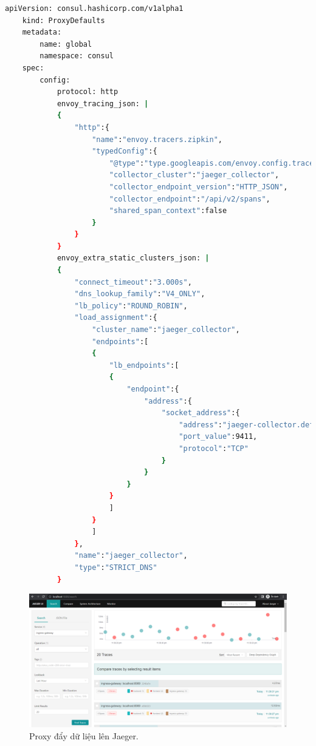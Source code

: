\documentclass[12pt,a4paper]{report}
\begin{document}
	\hspace{0.3cm}{Tiếp theo, chúng ta tiến hành đẩy dữ liệu từ ứng dụng frontend, backend và Proxy lên Jaeger. Để làm được điều này, chúng ta cần can thiệp vào trong code của ứng dụng. Tuy nhiên, ứng dụng frontend và backend đã được cấu hình để có thể đẩy dữ liệu ứng dụng lên trên Jaeger nên chúng ta chỉ việc khai báo thêm biến môi trường cho ứng dụng và ứng dụng sẽ đẩy dữ liệu lên. Còn đối với Proxy, chúng ta cần cấu hình lại một chút như sau:}
	\begin{lstlisting}[language=Bash]
	apiVersion: consul.hashicorp.com/v1alpha1
	kind: ProxyDefaults
	metadata:
		name: global
		namespace: consul
	spec:
		config:
			protocol: http
			envoy_tracing_json: |
			{
				"http":{
					"name":"envoy.tracers.zipkin",
					"typedConfig":{
						"@type":"type.googleapis.com/envoy.config.trace.v3.ZipkinConfig",
						"collector_cluster":"jaeger_collector",
						"collector_endpoint_version":"HTTP_JSON",
						"collector_endpoint":"/api/v2/spans",
						"shared_span_context":false
					}
				}
			}
			envoy_extra_static_clusters_json: |
			{
				"connect_timeout":"3.000s",
				"dns_lookup_family":"V4_ONLY",
				"lb_policy":"ROUND_ROBIN",
				"load_assignment":{
					"cluster_name":"jaeger_collector",
					"endpoints":[
					{
						"lb_endpoints":[
						{
							"endpoint":{
								"address":{
									"socket_address":{
										"address":"jaeger-collector.default",
										"port_value":9411,
										"protocol":"TCP"
									}
								}
							}
						}
						]
					}
					]
				},
				"name":"jaeger_collector",
				"type":"STRICT_DNS"
			}
	\end{lstlisting}
	\hspace{1.0cm}{Sau khi apply lại, thì chúng ta sẽ lên giao diện của Jaeger và kiểm tra: \\}
	\begin{figure}[h]
		\centering
		\includegraphics[width=0.7\linewidth]{Pics/jaeger-ingress-gateway}
		\caption{\label{fig:jaeger-ingress-gateway} Proxy đẩy dữ liệu lên Jaeger.}
		\label{fig:jaeger-ingress-gateway}
	\end{figure}
\end{document}
